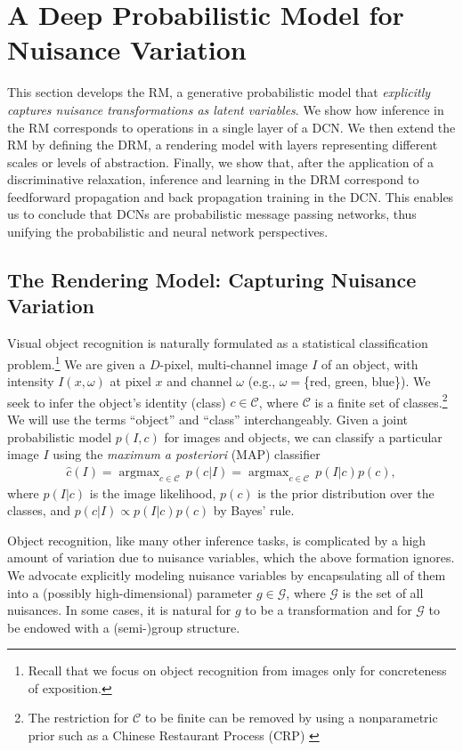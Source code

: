 \documentclass[12pt]{article}
\DeclareMathOperator*{\argmax}{argmax}
\newcommand{\Cl}[0]{{ \mathcal{C} }}
\newcommand{\G}[0]{{ \mathcal{G} }}
\begin{document}
\section{A Deep Probabilistic Model for Nuisance Variation}
\label{sec:drm}

This section develops the RM, a generative probabilistic model that \textit{explicitly captures nuisance transformations as latent variables}. 
We show how inference in the RM corresponds to operations in a single layer of a DCN. 
We then extend the RM by defining the DRM, a rendering model with layers representing different scales or levels of abstraction. 
Finally, we show that, after the application of a discriminative relaxation, inference and learning in the DRM correspond to feedforward propagation and back propagation training in the DCN. This enables us to conclude that DCNs are probabilistic message passing networks, thus unifying the probabilistic and neural network perspectives.

\subsection{The Rendering Model: Capturing Nuisance Variation}
\label{sec:rm}

Visual object recognition is naturally formulated as a statistical classification problem.\footnote{Recall that we focus on object recognition from images only for concreteness of exposition.}
We are given a $D$-pixel, multi-channel image $I$ of an object, with intensity $I(x, \omega)$ at pixel $x$ and channel $\omega$ (e.g., $\omega= $\{red, green, blue\}).
We seek to infer the object's identity (class) $c \in \Cl$, where $\Cl$ is a finite set of classes.\footnote{The restriction for $\Cl$ to be finite can be removed by using a nonparametric prior such as a Chinese Restaurant Process (CRP) \cite{griffiths2004hierarchical}}
We will use the terms ``object'' and ``class'' interchangeably.
Given a joint probabilistic model $p(I,c)$ for images and objects, we can classify a particular image $I$ using the {\em maximum a posteriori} (MAP) classifier 
\begin{align}
    \label{eqn:map_est_class}
     \hat{c}(I) = \argmax_{c \in \Cl}\, p(c|I) = \argmax_{c \in \Cl}\, p(I|c)p(c),
\end{align}
where $p(I|c)$ is the image likelihood, $p(c)$ is the prior distribution over the classes, and $p(c|I) \propto p(I|c) p(c)$ by Bayes' rule.  


Object recognition, like many other inference tasks, is complicated by a high amount of variation due to nuisance variables, which the above formation ignores.  We advocate explicitly modeling nuisance variables by encapsulating all of them into a (possibly high-dimensional) parameter $g \in \G$, where $\G$ is the set of all nuisances. In some cases, it is natural for $g$ to be a transformation and for $\G$ to be endowed with a (semi-)group structure.
\end{document}
